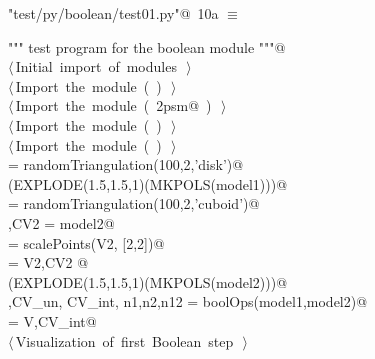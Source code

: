 \documentclass[11pt,oneside]{article}	%
\begin{document}
\begin{flushleft} \small
\begin{minipage}{\linewidth} \label{scrap19}
\protect{}\verb@"test/py/boolean/test01.py"@\nobreak\ {\footnotesize 10a }$\equiv$
\vspace{-1ex}
\begin{list}{}{} \item
\mbox{}\verb@""" test program for the boolean module """@\\
\mbox{}\verb@@\hbox{$\langle\,$Initial import of modules\nobreak\ {\footnotesize {}}$\,\rangle$}\verb@@\\
\mbox{}\verb@@\hbox{$\langle\,$Import the module\nobreak\ ({\footnotesize {}\label{scrap20}
 }\mbox{}\verb@boolean@ ) {\footnotesize {}}$\,\rangle$}\verb@@\\
\mbox{}\verb@@\hbox{$\langle\,$Import the module\nobreak\ ({\footnotesize {}\label{scrap21}
 }\mbox{}\verb@lar2psm@ ) {\footnotesize {}}$\,\rangle$}\verb@@\\
\mbox{}\verb@@\hbox{$\langle\,$Import the module\nobreak\ ({\footnotesize {}\label{scrap22}
 }\mbox{}\verb@simplexn@ ) {\footnotesize {}}$\,\rangle$}\verb@@\\
\mbox{}\verb@@\hbox{$\langle\,$Import the module\nobreak\ ({\footnotesize {}\label{scrap23}
 }\mbox{}\verb@larcc@ ) {\footnotesize {}}$\,\rangle$}\verb@@\\
\mbox{} = randomTriangulation(100,2,'disk')@\\
\mbox{}\verb@VIEW(EXPLODE(1.5,1.5,1)(MKPOLS(model1)))@\\
\mbox{} = randomTriangulation(100,2,'cuboid')@\\
\mbox{},CV2 = model2@\\
\mbox{} = scalePoints(V2, [2,2])@\\
\mbox{} = V2,CV2 @\\
\mbox{}\verb@VIEW(EXPLODE(1.5,1.5,1)(MKPOLS(model2)))@\\
\mbox{}\verb@V,CV_un, CV_int, n1,n2,n12 = boolOps(model1,model2)@\\
\mbox{}\verb@model = V,CV_int@\\
\mbox{}\verb@@\hbox{$\langle\,$Visualization of first Boolean step\nobreak\ {\footnotesize {}}$\,\rangle$}\verb@@\\
\mbox{}\verb@@{\NWsep}
\end{list}
\vspace{-2ex}
\end{minipage}\\[4ex]
\end{flushleft}
\end{document}
